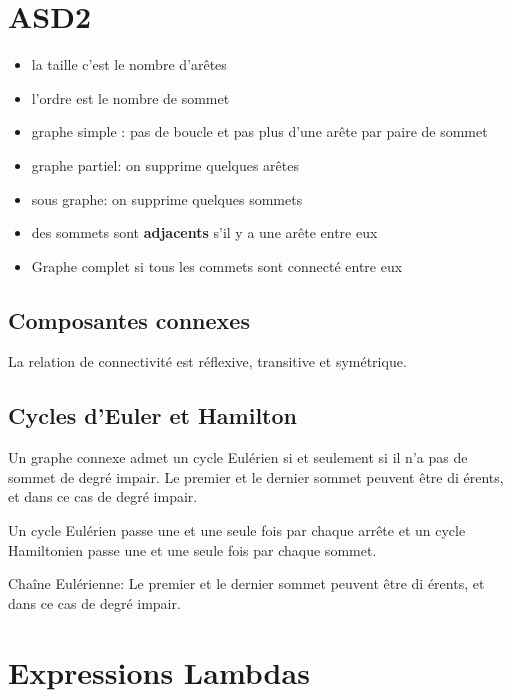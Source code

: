 \documentclass[
]{article}
\date{}
\begin{document}
\hypertarget{header-n2}{%
\section{ASD2}\label{header-n2}}

\begin{itemize}
\item
  la taille c'est le nombre d'arêtes
\item
  l'ordre est le nombre de sommet
\item
  graphe simple : pas de boucle et pas plus d'une arête par paire de
  sommet
\item
  graphe partiel: on supprime quelques arêtes 
\item
  sous graphe: on supprime quelques sommets
\item
  des sommets sont \textbf{adjacents} s'il y a une arête entre eux
\item
  Graphe complet si tous les commets sont connecté entre eux
\end{itemize}

\hypertarget{header-n19}{%
\subsection{Composantes connexes }\label{header-n19}}

La relation de connectivité est réflexive, transitive et symétrique.

\hypertarget{header-n21}{%
\subsection{Cycles d'Euler et Hamilton}\label{header-n21}}

Un graphe connexe admet un cycle Eulérien si et seulement si il n'a pas
de sommet de degré impair. Le premier et le dernier sommet peuvent être
di érents, et dans ce cas de degré impair.

Un cycle Eulérien passe une et une seule fois par chaque arrête et un
cycle Hamiltonien passe une et une seule fois par chaque sommet.

Chaîne Eulérienne: Le premier et le dernier sommet peuvent être di
érents, et dans ce cas de degré impair.

\hypertarget{header-n23}{%
\section{Expressions Lambdas }\label{header-n23}}
\end{document}
